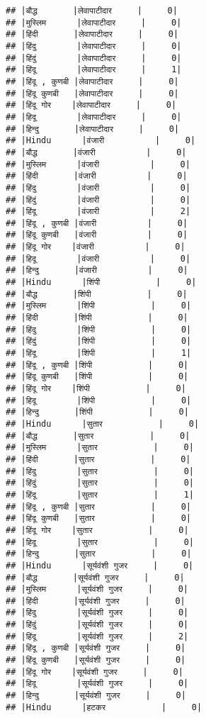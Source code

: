 \documentclass[
]{article}
\begin{document}
\begin{verbatim}
## |बौद्ध       |लेवापाटीदार     |     0|
## |मुस्लिम      |लेवापाटीदार     |     0|
## |हिंदी       |लेवापाटीदार     |     0|
## |हिंदु        |लेवापाटीदार     |     0|
## |हिंदुं        |लेवापाटीदार     |     0|
## |हिंदू        |लेवापाटीदार     |     1|
## |हिंदू , कुणबी |लेवापाटीदार     |     0|
## |हिंदू कुणबी   |लेवापाटीदार     |     0|
## |हिंदू गोर    |लेवापाटीदार     |     0|
## |हिदू        |लेवापाटीदार     |     0|
## |हिन्दु       |लेवापाटीदार     |     0|
## |Hindu      |वंजारी          |     0|
## |बौद्ध       |वंजारी          |     0|
## |मुस्लिम      |वंजारी          |     0|
## |हिंदी       |वंजारी          |     0|
## |हिंदु        |वंजारी          |     0|
## |हिंदुं        |वंजारी          |     0|
## |हिंदू        |वंजारी          |     2|
## |हिंदू , कुणबी |वंजारी          |     0|
## |हिंदू कुणबी   |वंजारी          |     0|
## |हिंदू गोर    |वंजारी          |     0|
## |हिदू        |वंजारी          |     0|
## |हिन्दु       |वंजारी          |     0|
## |Hindu      |शिंपी           |     0|
## |बौद्ध       |शिंपी           |     0|
## |मुस्लिम      |शिंपी           |     0|
## |हिंदी       |शिंपी           |     0|
## |हिंदु        |शिंपी           |     0|
## |हिंदुं        |शिंपी           |     0|
## |हिंदू        |शिंपी           |     1|
## |हिंदू , कुणबी |शिंपी           |     0|
## |हिंदू कुणबी   |शिंपी           |     0|
## |हिंदू गोर    |शिंपी           |     0|
## |हिदू        |शिंपी           |     0|
## |हिन्दु       |शिंपी           |     0|
## |Hindu      |सुतार           |     0|
## |बौद्ध       |सुतार           |     0|
## |मुस्लिम      |सुतार           |     0|
## |हिंदी       |सुतार           |     0|
## |हिंदु        |सुतार           |     0|
## |हिंदुं        |सुतार           |     0|
## |हिंदू        |सुतार           |     1|
## |हिंदू , कुणबी |सुतार           |     0|
## |हिंदू कुणबी   |सुतार           |     0|
## |हिंदू गोर    |सुतार           |     0|
## |हिदू        |सुतार           |     0|
## |हिन्दु       |सुतार           |     0|
## |Hindu      |सूर्यवंशी गुजर     |     0|
## |बौद्ध       |सूर्यवंशी गुजर     |     0|
## |मुस्लिम      |सूर्यवंशी गुजर     |     0|
## |हिंदी       |सूर्यवंशी गुजर     |     0|
## |हिंदु        |सूर्यवंशी गुजर     |     0|
## |हिंदुं        |सूर्यवंशी गुजर     |     0|
## |हिंदू        |सूर्यवंशी गुजर     |     2|
## |हिंदू , कुणबी |सूर्यवंशी गुजर     |     0|
## |हिंदू कुणबी   |सूर्यवंशी गुजर     |     0|
## |हिंदू गोर    |सूर्यवंशी गुजर     |     0|
## |हिदू        |सूर्यवंशी गुजर     |     0|
## |हिन्दु       |सूर्यवंशी गुजर     |     0|
## |Hindu      |हटकर           |     0|

\end{verbatim}
\end{document}
